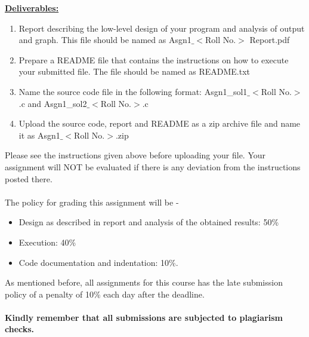 \documentclass{article}
\begin{document}
\noindent\textbf{\underline {Deliverables: }}
\begin{enumerate}
    \item Report describing the low-level design of your program and analysis of output and graph. This file should be named as Asgn1$\_<$Roll No.$>$ Report.pdf
    \item Prepare a README file that contains the instructions on how to execute your submitted file. The file should be named as README.txt
    \item Name the source code file in the following format: Asgn1\_sol1$\_<$Roll No.$>$.c and Asgn1\_sol2$\_<$Roll No.$>$.c
    \item Upload the source code, report and README as a zip archive file and name it as Asgn1$\_<$Roll No.$>$.zip
    
\end{enumerate}
Please see the instructions given above before uploading your file. Your assignment will NOT be evaluated if there is any deviation from the instructions posted there.\\
\\
The policy for grading this assignment will be -\\
\begin{itemize}
    \item Design as described in report and analysis of the obtained results: 50\%
    \item Execution: 40\%
    \item Code documentation and indentation: 10\%.
\end{itemize}
As mentioned before, all assignments for this course has the late submission policy of a penalty of 10\% each day after the deadline.\\\\
\textbf{Kindly remember that all submissions are subjected to plagiarism checks.}
\end{document}
